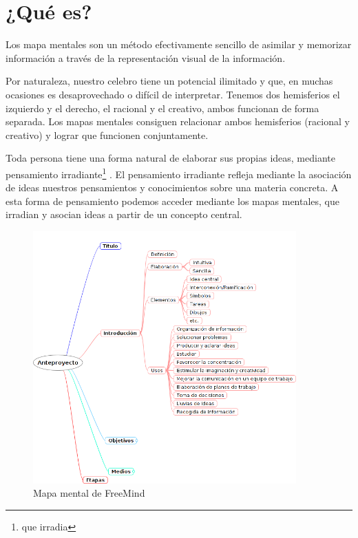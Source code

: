 \section{¿Qué es?}

Los mapa mentales son un método efectivamente sencillo de asimilar y memorizar información a través de la representación visual de la información. 

Por naturaleza, nuestro celebro tiene un potencial ilimitado y que, en muchas ocasiones es desaprovechado o difícil de interpretar. Tenemos dos hemisferios el izquierdo y el derecho, el racional y el creativo, ambos funcionan de forma separada. Los mapas mentales consiguen relacionar ambos hemisferios (racional y creativo) y lograr que funcionen conjuntamente. 

Toda persona tiene una forma natural de elaborar sus propias ideas, mediante pensamiento irradiante\footnote{que irradia} . El pensamiento irradiante refleja mediante la asociación de ideas nuestros pensamientos y conocimientos sobre una materia concreta.  A esta forma de pensamiento podemos acceder mediante los mapas mentales, que irradian y asocian ideas a partir de un concepto central. 

\begin{figure}[htbp]
\centering
\includegraphics[width=0.9\textwidth]{imagenes/freemind}
\caption{Mapa mental de FreeMind}
\label{fig:freemind}
\end{figure}


